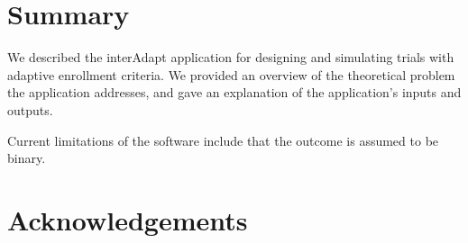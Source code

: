 \documentclass{article}
\newcommand{\interAdapt}{\textsf{interAdapt }}
\begin{document}
\section*{Summary}

We described the \interAdapt application for designing and simulating trials with adaptive enrollment criteria. We provided an overview of the theoretical problem the application addresses, and gave an explanation of the application’s inputs and outputs.

Current limitations of the software include that the outcome is assumed to be binary.



\section*{Acknowledgements}






\end{document}
